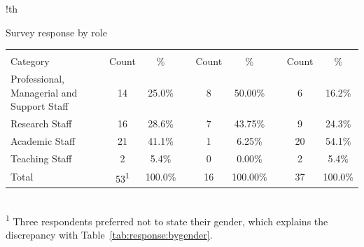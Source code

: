 \begin{tabbox}{!th}
\caption{Survey response by role}
\label{tab:response:byrole}
\footnotesize   
\begin{tabular}{p{6.0cm} 
                !{\qquad}
                S[table-format=2.0]
                !{\quad}
                S[table-format=2.1\%]
                p{0.5cm}                
                S[table-format=2.0]
                !{\quad}
                S[table-format=3.2\%]
                p{0.5cm}                
                S[table-format=2.0]
                !{\quad}
                S[table-format=3.1\%]
                }

\toprule 
&&&&&\\
Category & {Count} & {\%} && {Count} & {\%} && {Count} & {\%}\\
\midrule 
Professional, Managerial and Support Staff & 14 & 25.0\% && 8 & 50.00\% && 6 & 16.2\%\\
\hdashline
Research Staff	& 16	 & 28.6\%	& & 7	& 43.75\%	&& 9	& 24.3\%\\
\hdashline
Academic Staff	& 21	& 41.1\%	&& 1 &	6.25\%	&& 20	&54.1\%\\
\hdashline
Teaching Staff	& 2	& 5.4\%	&& 0	& 0.00\%	&& 2	& 5.4\%\\
\midrule
Total & 53\textsuperscript{1} & 100.0\% && 16 & 100.00\% & & 37 & 100.0\%\\
\bottomrule 
\end{tabular}
{\\[.1in]
\sffamily
\textsuperscript{1} Three respondents preferred not to state their gender, which explains the discrepancy with Table~\ref{tab:response:bygender}.
}
\end{tabbox}
